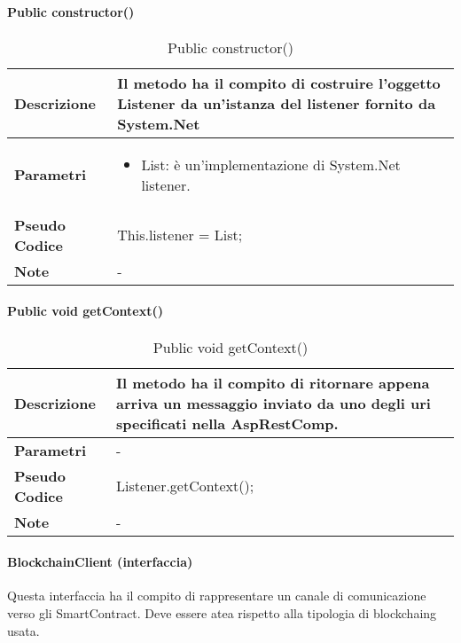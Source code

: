 \paragraph{Public constructor()}
    \begin{center}
        \begin{longtable}{|p{3cm}|p{9cm}|}%
        \caption{Public constructor()}
        \label{tab:public-list-constructor}
        \endfirsthead
        \endhead
        \hline
        \textbf{Descrizione} & Il metodo ha il compito di costruire l’oggetto Listener da un’istanza del listener fornito da System.Net \\
        \hline
        \textbf{Parametri} &      
            \begin{itemize}
                \item List: è un’implementazione di System.Net listener.
            \end{itemize}
        \\
        \hline
        \textbf{Pseudo Codice} & 
            This.listener = List; \\
        \hline
        \textbf{Note} & - \\
        \hline
        \end{longtable}
        \end{center}


\paragraph{Public void getContext()}
\begin{center}
    \begin{longtable}{|p{3cm}|p{9cm}|}%
    \caption{Public void getContext()}
    \label{tab:public-void-getContextImpl}
    \endfirsthead
    \endhead
    \hline
    \textbf{Descrizione} & Il metodo ha il compito di ritornare appena arriva un messaggio inviato da uno degli uri specificati nella AspRestComp. \\
    \hline
    \textbf{Parametri} &      
     - \\
    \hline
    \textbf{Pseudo Codice} & 
    Listener.getContext();\\
    \hline
    \textbf{Note} & - \\
    \hline
    \end{longtable}
    \end{center}


\paragraph{BlockchainClient (interfaccia)}
Questa interfaccia ha il compito di rappresentare un canale di comunicazione verso gli SmartContract. Deve essere atea rispetto alla tipologia di \gls{blockchaing} usata.

